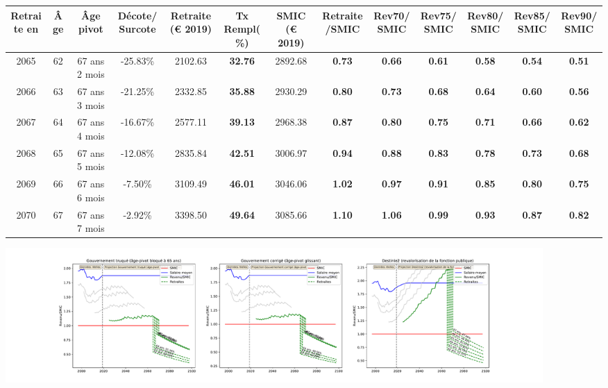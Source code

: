 { \scriptsize \begin{center} 
\begin{tabular}[htb]{|c|c||c|c||c|c||c||c|c|c|c|c|c|} 
\hline 
 Retraite en &  Âge &  Âge pivot &  Décote/Surcote &  Retraite (\euro{} 2019) &  Tx Rempl(\%) &  SMIC (\euro{} 2019) &  Retraite/SMIC &  Rev70/SMIC &  Rev75/SMIC &  Rev80/SMIC &  Rev85/SMIC &  Rev90/SMIC \\ 
\hline \hline 
 2065 &  62 &  67 ans 2 mois &  -25.83\% &  2102.63 &  {\bf 32.76} &  2892.68 &  {\bf {\color{red} 0.73}} &  {\bf {\color{red} 0.66}} &  {\bf {\color{red} 0.61}} &  {\bf {\color{red} 0.58}} &  {\bf {\color{red} 0.54}} &  {\bf {\color{red} 0.51}} \\ 
\hline 
 2066 &  63 &  67 ans 3 mois &  -21.25\% &  2332.85 &  {\bf 35.88} &  2930.29 &  {\bf {\color{red} 0.80}} &  {\bf {\color{red} 0.73}} &  {\bf {\color{red} 0.68}} &  {\bf {\color{red} 0.64}} &  {\bf {\color{red} 0.60}} &  {\bf {\color{red} 0.56}} \\ 
\hline 
 2067 &  64 &  67 ans 4 mois &  -16.67\% &  2577.11 &  {\bf 39.13} &  2968.38 &  {\bf {\color{red} 0.87}} &  {\bf {\color{red} 0.80}} &  {\bf {\color{red} 0.75}} &  {\bf {\color{red} 0.71}} &  {\bf {\color{red} 0.66}} &  {\bf {\color{red} 0.62}} \\ 
\hline 
 2068 &  65 &  67 ans 5 mois &  -12.08\% &  2835.84 &  {\bf 42.51} &  3006.97 &  {\bf {\color{red} 0.94}} &  {\bf {\color{red} 0.88}} &  {\bf {\color{red} 0.83}} &  {\bf {\color{red} 0.78}} &  {\bf {\color{red} 0.73}} &  {\bf {\color{red} 0.68}} \\ 
\hline 
 2069 &  66 &  67 ans 6 mois &  -7.50\% &  3109.49 &  {\bf 46.01} &  3046.06 &  {\bf 1.02} &  {\bf {\color{red} 0.97}} &  {\bf {\color{red} 0.91}} &  {\bf {\color{red} 0.85}} &  {\bf {\color{red} 0.80}} &  {\bf {\color{red} 0.75}} \\ 
\hline 
 2070 &  67 &  67 ans 7 mois &  -2.92\% &  3398.50 &  {\bf 49.64} &  3085.66 &  {\bf 1.10} &  {\bf 1.06} &  {\bf {\color{red} 0.99}} &  {\bf {\color{red} 0.93}} &  {\bf {\color{red} 0.87}} &  {\bf {\color{red} 0.82}} \\ 
\hline 
\hline 
\end{tabular} 
\end{center} } 

 \begin{center}\includegraphics[width=0.9\textwidth]{fig/Redacteur_2003_22_dest_retraite.pdf}\end{center} \label{fig/Redacteur_2003_22_dest_retraite.pdf} 

